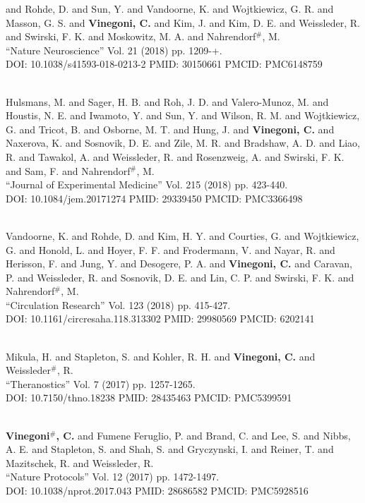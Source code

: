 and Rohde, D. and Sun, Y. and Vandoorne, K. and Wojtkiewicz, G. R. and Masson, G. S. and {\bf Vinegoni, C.} and Kim, J. and Kim, D. E. and Weissleder, R. and Swirski, F. K. and Moskowitz, M. A. and Nahrendorf$^\#$, M. \\ ``Nature Neuroscience'' Vol. 21 (2018) pp. 1209-+. \\ DOI: 10.1038/s41593-018-0213-2 PMID: 30150661 PMCID: PMC6148759 \item {} \\ Hulsmans, M. and Sager, H. B. and Roh, J. D. and Valero-Munoz, M. and Houstis, N. E. and Iwamoto, Y. and Sun, Y. and Wilson, R. M. and Wojtkiewicz, G. and Tricot, B. and Osborne, M. T. and Hung, J. and {\bf Vinegoni, C.} and Naxerova, K. and Sosnovik, D. E. and Zile, M. R. and Bradshaw, A. D. and Liao, R. and Tawakol, A. and Weissleder, R. and Rosenzweig, A. and Swirski, F. K. and Sam, F. and Nahrendorf$^\#$, M. \\ ``Journal of Experimental Medicine'' Vol. 215 (2018) pp. 423-440. \\ DOI: 10.1084/jem.20171274 PMID: 29339450 PMCID: PMC3366498\item {} \\ Vandoorne, K. and Rohde, D. and Kim, H. Y. and Courties, G. and Wojtkiewicz, G. and Honold, L. and Hoyer, F. F. and Frodermann, V. and Nayar, R. and Herisson, F. and Jung, Y. and Desogere, P. A. and {\bf Vinegoni, C.} and Caravan, P. and Weissleder, R. and Sosnovik, D. E. and Lin, C. P. and Swirski, F. K. and Nahrendorf$^\#$, M. \\ ``Circulation Research'' Vol. 123 (2018) pp. 415-427. \\ DOI: 10.1161/circresaha.118.313302 PMID: 29980569 PMCID: 6202141\item {} \\ Mikula, H. and Stapleton, S. and Kohler, R. H. and {\bf Vinegoni, C.} and Weissleder$^\#$, R. \\ ``Theranostics'' Vol. 7 (2017) pp. 1257-1265. \\ DOI: 10.7150/thno.18238 PMID: 28435463 PMCID: PMC5399591\item {} \\ {\bf Vinegoni$^\#$, C.} and Fumene Feruglio, P. and Brand, C. and Lee, S. and Nibbs, A. E. and Stapleton, S. and Shah, S. and Gryczynski, I. and Reiner, T. and Mazitschek, R. and Weissleder, R. \\ ``Nature Protocols'' Vol. 12 (2017) pp. 1472-1497. \\ DOI: 10.1038/nprot.2017.043 PMID: 28686582 PMCID: PMC5928516\item 
